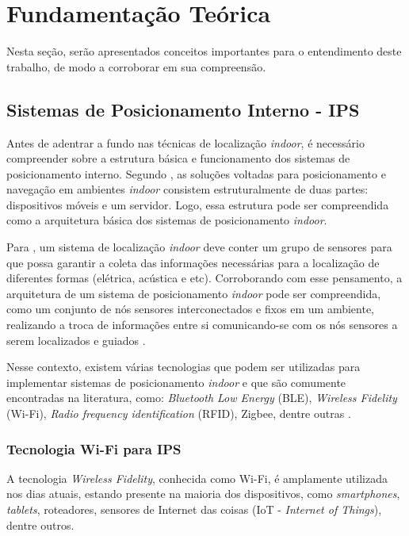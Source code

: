 \documentclass[12pt]{artigoifce}
\begin{document}
\section{Fundamentação Teórica}
\label{sec-fundamentacao}

Nesta seção, serão apresentados conceitos importantes para o entendimento deste trabalho, de modo a corroborar em sua compreensão. 

\subsection{Sistemas de Posicionamento Interno - IPS}
\label{sec-fundamentacao-ips}

Antes de adentrar a fundo nas técnicas de localização \textit{indoor}, é necessário compreender sobre a estrutura básica e funcionamento dos sistemas de posicionamento interno. Segundo , as soluções voltadas para posicionamento e navegação em ambientes \textit{indoor} consistem estruturalmente de duas partes: dispositivos móveis e um servidor. Logo, essa estrutura pode ser compreendida como a arquitetura básica dos sistemas de posicionamento \textit{indoor}. 

Para , um sistema de localização \textit{indoor} deve conter um grupo de sensores para que possa garantir a coleta das informações necessárias para a localização de diferentes formas (elétrica, acústica e etc). Corroborando com esse pensamento, a arquitetura de um sistema de posicionamento \textit{indoor} pode ser compreendida, como um conjunto de nós sensores interconectados e fixos em um ambiente, realizando a troca de informações entre si comunicando-se com os nós sensores a serem localizados e guiados \cite{mendes2021}. 

Nesse contexto, existem várias tecnologias que podem ser utilizadas para implementar sistemas de posicionamento \textit{indoor} e que são comumente encontradas na literatura, como: \textit{Bluetooth Low Energy} (BLE), \textit{Wireless Fidelity} (Wi-Fi), \textit{Radio frequency identification} (RFID), Zigbee, dentre outras \cite{mittelstadt2018}. 

\subsubsection{Tecnologia Wi-Fi para IPS} %
\label{sec-fundamentacao-wifi}

A tecnologia \textit{Wireless Fidelity}, conhecida como Wi-Fi, é amplamente utilizada nos dias atuais, estando presente na maioria dos dispositivos, como \textit{smartphones}, \textit{tablets}, roteadores, sensores de Internet das coisas (IoT - \textit{Internet of Things}), dentre outros. 
\end{document}
